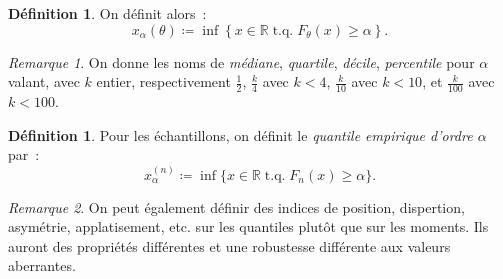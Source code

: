 \documentclass{report}
\DeclareMathOperator{\tq}{\text{ t.q. }}
\newcommand{\R}{\mathbb R}
\theoremstyle{definition}
\newtheorem{déf}[thm]{Définition}
\theoremstyle{remark}
\newtheorem*{rmq}{Remarque}
\begin{document}
		\begin{déf} On définit alors~:
		\[x_\alpha(\theta) \coloneqq \inf\left\{x \in \R \tq F_\theta(x) \geq \alpha\right\}.\]
		\end{déf}

		\begin{rmq} On donne les noms de \textit{médiane}, \textit{quartile}, \textit{décile}, \textit{percentile} pour $\alpha$ valant, avec $k$ entier,
		respectivement $\frac 12$, $\frac k4$ avec $k < 4$, $\frac k{10}$ avec $k < 10$, et $\frac k{100}$ avec $k < 100$.
		\end{rmq}

		\begin{déf} Pour les échantillons, on définit le \textit{quantile empirique d'ordre $\alpha$} par~:
		\[x_\alpha^{(n)} \coloneqq \inf\{x \in \R \tq F_n(x) \geq \alpha\}.\]
		\end{déf}

		\begin{rmq} On peut également définir des indices de position, dispertion, asymétrie, applatisement, etc. sur les quantiles plutôt que sur les moments.
		Ils auront des propriétés différentes et une robustesse différente aux valeurs aberrantes.
		\end{rmq}
\end{document}
